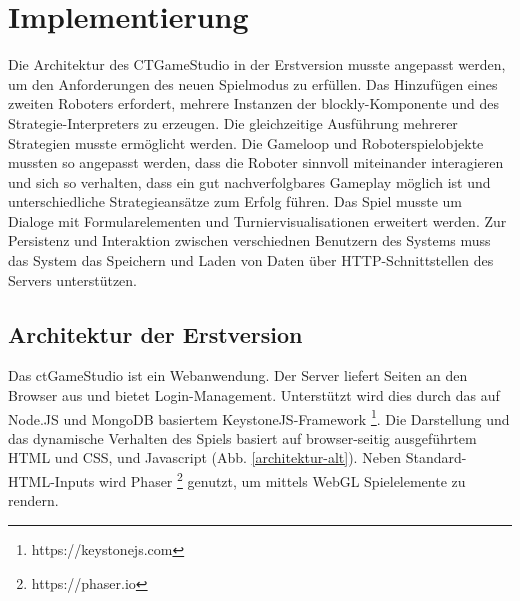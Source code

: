 \chapter{Implementierung}

Die Architektur des CTGameStudio in der Erstversion musste angepasst werden, um den Anforderungen
des neuen Spielmodus zu erfüllen. Das Hinzufügen eines zweiten Roboters erfordert, mehrere Instanzen
der blockly-Komponente und des Strategie-Interpreters zu erzeugen. Die gleichzeitige Ausführung
mehrerer Strategien musste ermöglicht werden. Die Gameloop und Roboterspielobjekte mussten so
angepasst werden, dass die Roboter sinnvoll miteinander interagieren und sich so verhalten, dass ein
gut nachverfolgbares Gameplay möglich ist und unterschiedliche Strategieansätze zum Erfolg führen.
Das Spiel musste um Dialoge mit Formularelementen und Turniervisualisationen erweitert werden. Zur
Persistenz und Interaktion zwischen verschiednen Benutzern des Systems muss das System das Speichern
und Laden von Daten über HTTP-Schnittstellen des Servers unterstützen.

\section{Architektur der Erstversion}

Das ctGameStudio ist ein Webanwendung. Der Server liefert Seiten an den Browser aus und bietet
Login-Management. Unterstützt wird dies durch das auf Node.JS und MongoDB basiertem
KeystoneJS-Framework \footnote{https://keystonejs.com}. Die Darstellung und das dynamische Verhalten
des Spiels basiert auf browser-seitig ausgeführtem HTML und CSS, und Javascript (Abb.
\ref{architektur-alt}). Neben Standard-HTML-Inputs wird Phaser \footnote{https://phaser.io} genutzt,
um mittels WebGL Spielelemente zu rendern.

